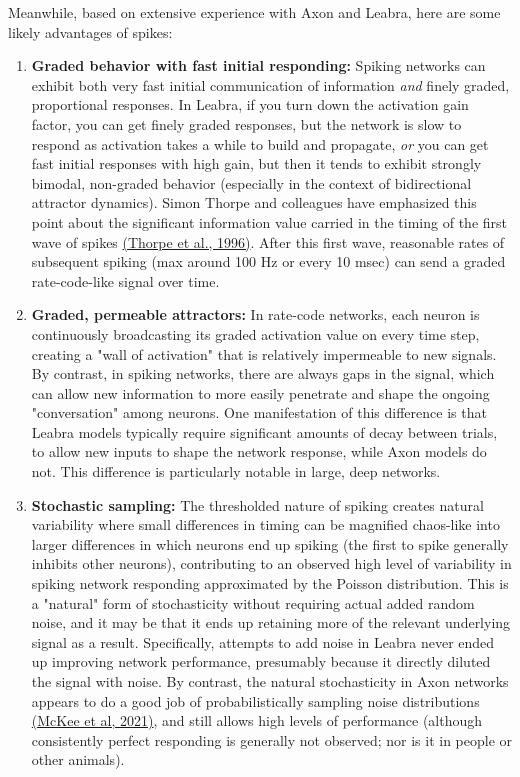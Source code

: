 \documentclass[11pt,twoside]{article}
\newif\myifpdf
\begin{document}
Meanwhile, based on extensive experience with Axon and Leabra, here are some likely advantages of spikes: 
\begin{enumerate}
\def\labelenumi{\arabic{enumi}.}
\item \textbf{Graded behavior with fast initial responding:} Spiking networks can exhibit both very fast initial communication of information \emph{and} finely graded, proportional responses. In Leabra, if you turn down the activation gain factor, you can get finely graded responses, but the network is slow to respond as activation takes a while to build and propagate, \emph{or} you can get fast initial responses with high gain, but then it tends to exhibit strongly bimodal, non-graded behavior (especially in the context of bidirectional attractor dynamics). Simon Thorpe and colleagues have emphasized this point about the significant information value carried in the timing of the first wave of spikes \protect\hyperlink{references}{(Thorpe et al., 1996)}. After this first wave, reasonable rates of subsequent spiking (max around 100 Hz or every 10 msec) can send a graded rate-code-like signal over time.

\item \textbf{Graded, permeable attractors:} In rate-code networks, each neuron is continuously broadcasting its graded activation value on every time step, creating a "wall of activation" that is relatively impermeable to new signals. By contrast, in spiking networks, there are always gaps in the signal, which can allow new information to more easily penetrate and shape the ongoing "conversation" among neurons.   One manifestation of this difference is that Leabra models typically require significant amounts of decay between trials, to allow new inputs to shape the network response, while Axon models do not. This difference is particularly notable in large, deep networks.

\item \textbf{Stochastic sampling:} The thresholded nature of spiking creates natural variability where small differences in timing can be magnified chaos-like into larger differences in which neurons end up spiking (the first to spike generally inhibits other neurons), contributing to an observed high level of variability in spiking network responding approximated by the Poisson distribution. This is a "natural" form of stochasticity without requiring actual added random noise, and it may be that it ends up retaining more of the relevant underlying signal as a result. Specifically, attempts to add noise in Leabra never ended up improving network performance, presumably because it directly diluted the signal with noise. By contrast, the natural stochasticity in Axon networks appears to do a good job of probabilistically sampling noise distributions \protect\hyperlink{references}{(McKee et al, 2021)}, and still allows high levels of performance (although consistently perfect responding is generally not observed; nor is it in people or other animals).


\end{enumerate}
\end{document}
